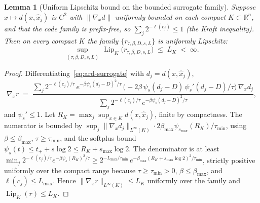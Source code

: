 \documentclass[11pt,a4paper]{article}
\theoremstyle{plain}
\newtheorem{lemma}[theorem]{Lemma}
\theoremstyle{definition}
\theoremstyle{remark}
\newcommand{\RR}{\mathbb{R}}
\DeclareMathOperator{\Lip}{Lip}
\begin{document}
\begin{lemma}[Uniform Lipschitz bound on the bounded surrogate family]
\label{lem:uniform-lip}
Suppose $x \mapsto d(x, \hat x_j)$ is $C^2$ with $\|\nabla_x d\|$
uniformly bounded on each compact $K \subset \RR^n$, and that the
code family is prefix-free, so $\sum_j 2^{-\ell(c_j)} \le 1$ (the
Kraft inequality). Then on every compact $K$ the family
$\{r_{\tau,\beta,D,s,L}\}$ is uniformly Lipschitz:
\[
  \sup_{(\tau,\beta,D,s,L)}\, \Lip_K\!\bigl(
  r_{\tau,\beta,D,s,L}\bigr) \;\leq\; L_K \;<\; \infty.
\]
\end{lemma}

\begin{proof}
Differentiating~\eqref{eq:ard-surrogate} with $d_j = d(x, \hat x_j)$,
\[
  \nabla_x r \;=\;
  \frac{\sum_j 2^{-\ell(c_j)/\tau}\,
  e^{-\beta \psi_s(d_j - D)^2/\tau}
  \,\bigl(-2\beta\,\psi_s(d_j-D)\,\psi_s'(d_j-D)/\tau\bigr)\,
  \nabla_x d_j}
  {\sum_j 2^{-\ell(c_j)/\tau}\, e^{-\beta \psi_s(d_j - D)^2/\tau}},
\]
and $\psi_s' \le 1$. Let $R_K = \max_j \sup_{x \in K} d(x, \hat x_j)$,
finite by compactness. The numerator is bounded by
$\sup_j\|\nabla_x d_j\|_{L^\infty(K)} \cdot 2\beta_{\max}
\psi_{s_{\max}}(R_K)/\tau_{\min}$, using $\beta \le \beta_{\max}$,
$\tau \ge \tau_{\min}$, and the softplus bound $\psi_s(t) \le t_+ +
s\log 2 \le R_K + s_{\max}\log 2$. The denominator is at least
$\min_j 2^{-\ell(c_j)/\tau} e^{-\beta\psi_{s}(R_K)^2/\tau} \ge
2^{-L_{\max}/\tau_{\min}}\, e^{-\beta_{\max}(R_K + s_{\max}\log
2)^2/\tau_{\min}}$, strictly positive uniformly over the compact
range because $\tau \ge \tau_{\min} > 0$, $\beta \le \beta_{\max}$,
and $\ell(c_j) \le L_{\max}$. Hence
$\|\nabla_x r\|_{L^\infty(K)} \le L_K$ uniformly over the family and
$\Lip_K(r) \le L_K$.
\end{proof}
\end{document}
